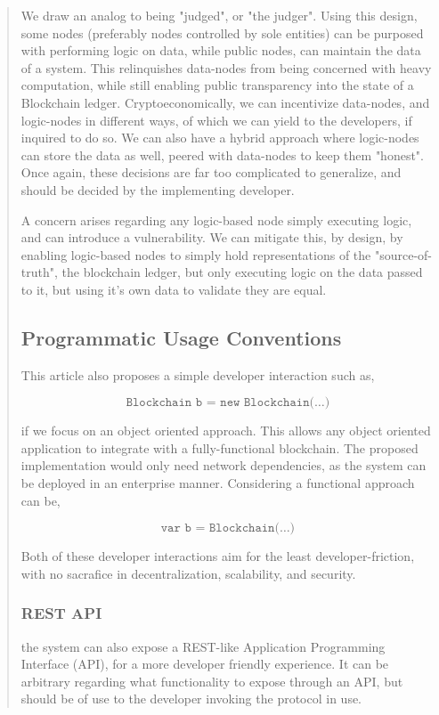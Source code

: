 \documentclass[12pt, titlepage, twocolumn]{report}
\begin{document}
\begin{quotation}
We draw an analog to being "judged", or "the judger". Using this design, some nodes (preferably nodes controlled by sole entities) can be purposed with performing logic on data, while public nodes, can maintain the data of a system. This relinquishes data-nodes from being concerned with heavy computation, while still enabling public transparency into the state of a Blockchain ledger. Cryptoeconomically, we can incentivize data-nodes, and logic-nodes in different ways, of which we can yield to the developers, if inquired to do so. We can also have a hybrid approach where logic-nodes can store the data as well, peered with data-nodes to keep them "honest". Once again, these decisions are far too complicated to generalize, and should be decided by the implementing developer.

A concern arises regarding any logic-based node simply executing logic, and can introduce a vulnerability. We can mitigate this, by design, by enabling logic-based nodes to simply hold representations of the "source-of-truth", the blockchain ledger, but only executing logic on the data passed to it, but using it's own data to validate they are equal.

\subsection{Programmatic Usage Conventions}
This article also proposes a simple developer interaction such as,

\begin{equation}
\texttt{Blockchain b = new Blockchain(\ldots)}
\end{equation}

if we focus on an object oriented approach. This allows any object oriented application to integrate with a fully-functional blockchain. The proposed implementation would only need network dependencies, as the system can be deployed in an enterprise manner. Considering a functional approach can be,

\begin{equation}
\texttt{var b = Blockchain(\ldots)}
\end{equation}

Both of these developer interactions aim for the least developer-friction, with no sacrafice in decentralization, scalability, and security.

\subsubsection{REST API}
the system can also expose a REST-like Application Programming Interface (API), for a more developer friendly experience. It can be arbitrary regarding what functionality to expose through an API, but should be of use to the developer invoking the protocol in use.


\end{quotation}
\end{document}

